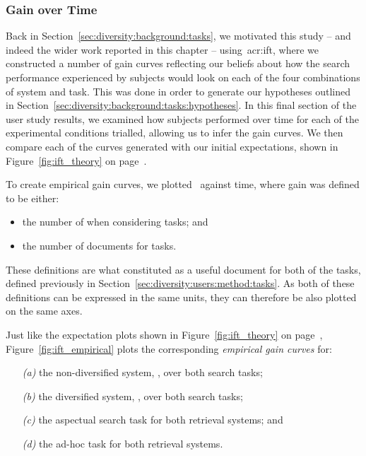 \subsubsection{Gain over Time}\label{sec:diversity:users:results:ift}
Back in Section~\ref{sec:diversity:background:tasks}, we motivated this study -- and indeed the wider work reported in this chapter -- using~\gls{acr:ift}, where we constructed a number of gain curves reflecting our beliefs about how the search performance experienced by subjects would look on each of the four combinations of system and task. This was done in order to generate our hypotheses outlined in Section~\ref{sec:diversity:background:tasks:hypotheses}. In this final section of the user study results, we examined how subjects performed over time for each of the experimental conditions trialled, allowing us to infer the gain curves. We then compare each of the curves generated with our initial expectations, shown in Figure~\ref{fig:ift_theory} on page~\pageref{fig:ift_theory}.

To create empirical gain curves, we plotted~ against time, where gain was defined to be either:

\begin{itemize}
    \item{the number of  when considering  tasks; and}
    \item{the number of  documents for  tasks.}
\end{itemize}

These definitions are what constituted as a useful document for both of the tasks, defined previously in Section~\ref{sec:diversity:users:method:tasks}. As both of these definitions can be expressed in the same units, they can therefore be also plotted on the same axes.

Just like the expectation plots shown in Figure~\ref{fig:ift_theory} on page~\pageref{fig:ift_theory}, Figure~\ref{fig:ift_empirical} plots the corresponding \emph{empirical gain curves} for:

\begin{itemize}
    \item[\emph{(a)}]{the non-diversified system, , over both search tasks;}
    \item[\emph{(b)}]{the diversified system, , over both search tasks;}
    \item[\emph{(c)}]{the aspectual search task for both retrieval systems; and}
    \item[\emph{(d)}]{the ad-hoc task for both retrieval systems.}
\end{itemize}

